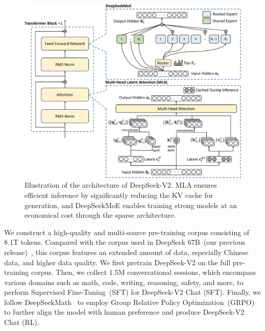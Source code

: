 \documentclass[11pt, a4paper, logo, copyright, nonumbering]{deepseek}
\newcommand{\dsvi}{DeepSeek 67B}
\newcommand{\dsvii}{DeepSeek-V2}
\newcommand{\dsviisft}{DeepSeek-V2 Chat (SFT)}
\newcommand{\dsviirl}{DeepSeek-V2 Chat (RL)}
\newcommand{\dsattn}{MLA}
\newcommand{\dsmoe}{DeepSeekMoE}
\begin{document}
\begin{CJK*}{UTF8}{gbsn}
\begin{figure}[!t]
\centering
\includegraphics[width=0.99\linewidth]{figures/deepseekv2.pdf}
\caption{
Illustration of the architecture of \dsvii{}. 
\dsattn{} ensures efficient inference by significantly reducing the KV cache for generation, and \dsmoe{} enables training strong models at an economical cost through the sparse architecture. 
}
\label{fig:dsvii}
\end{figure}

We construct a high-quality and multi-source pre-training corpus consisting of 8.1T tokens. 
Compared with the corpus used in \dsvi{}~(our previous release)~\citep{deepseek1}, this corpus features an extended amount of data, especially Chinese data, and higher data quality. 
We first pretrain \dsvii{} on the full pre-training corpus. 
Then, we collect 1.5M conversational sessions, which encompass various domains such as math, code, writing, reasoning, safety, and more, to perform Supervised Fine-Tuning~(SFT) for \dsviisft{}. 
Finally, we follow DeepSeekMath~\citep{deepseekmath} to employ Group Relative Policy Optimization~(GRPO) to further align the model with human preference and produce \dsviirl{}.


\end{CJK*}
\end{document}
